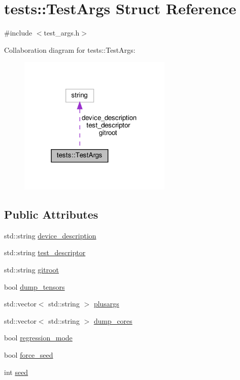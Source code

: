 \hypertarget{structtests_1_1TestArgs}{}\section{tests\+:\+:Test\+Args Struct Reference}
\label{structtests_1_1TestArgs}


{\ttfamily \#include $<$test\+\_\+args.\+h$>$}



Collaboration diagram for tests\+:\+:Test\+Args\+:\nopagebreak
\begin{figure}[H]
\begin{center}
\leavevmode
\includegraphics[width=207pt]{structtests_1_1TestArgs__coll__graph}
\end{center}
\end{figure}
\subsection*{Public Attributes}
\begin{DoxyCompactItemize}
\item 
std\+::string \hyperlink{structtests_1_1TestArgs_a3d843c12318312897e29428f6bc39c65}{device\+\_\+description}
\item 
std\+::string \hyperlink{structtests_1_1TestArgs_aac3629d45114721078dca6a6bb27b986}{test\+\_\+descriptor}
\item 
std\+::string \hyperlink{structtests_1_1TestArgs_a5fe492b8f262715e29547a81a4868d9f}{gitroot}
\item 
bool \hyperlink{structtests_1_1TestArgs_aae923f89bbd6b71b218a51fe6544481f}{dump\+\_\+tensors}
\item 
std\+::vector$<$ std\+::string $>$ \hyperlink{structtests_1_1TestArgs_a25bae49c946a2e91a641c644a0250063}{plusargs}
\item 
std\+::vector$<$ std\+::string $>$ \hyperlink{structtests_1_1TestArgs_a34d74d3077ef82959691a957a796e529}{dump\+\_\+cores}
\item 
bool \hyperlink{structtests_1_1TestArgs_a956bba7e1958d1e307955f8e3a46c02e}{regression\+\_\+mode}
\item 
bool \hyperlink{structtests_1_1TestArgs_a4d7793259b5f5b7543fe5df590c3744c}{force\+\_\+seed}
\item 
int \hyperlink{structtests_1_1TestArgs_a8e5b31cbcced7042e4f1cee4b4690a78}{seed}
\end{DoxyCompactItemize}


